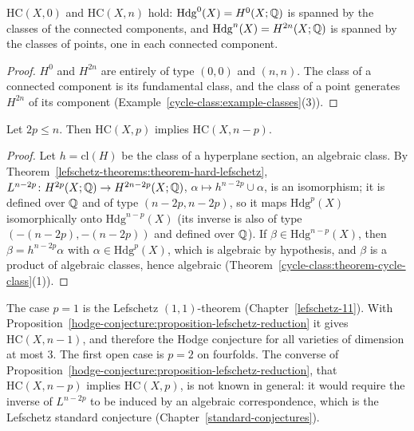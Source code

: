 \begin{proposition}\label{hodge-conjecture:proposition-trivial-degrees}
$\mathrm{HC}(X, 0)$ and $\mathrm{HC}(X, n)$ hold: $\mathrm{Hdg}^0(X) = H^0(X; \mathbb{Q})$ is spanned by the classes of the connected components, and $\mathrm{Hdg}^n(X) = H^{2n}(X; \mathbb{Q})$ is spanned by the classes of
points, one in each connected component.
\end{proposition}

\begin{proof}
$H^0$ and $H^{2n}$ are entirely of type $(0,0)$ and $(n,n)$. The class of a connected component is its fundamental class, and the class of a point generates $H^{2n}$ of its component
(Example~\ref{cycle-class:example-classes}(3)).
\end{proof}

\begin{proposition}\label{hodge-conjecture:proposition-lefschetz-reduction}
Let $2p \leq n$. Then $\mathrm{HC}(X, p)$ implies $\mathrm{HC}(X, n - p)$.
\end{proposition}

\begin{proof}
Let $h = \mathrm{cl}(H)$ be the class of a hyperplane section, an algebraic class. By Theorem~\ref{lefschetz-theorems:theorem-hard-lefschetz}, $L^{n-2p} \colon H^{2p}(X; \mathbb{Q}) \to H^{2n-2p}(X; \mathbb{Q})$,
$\alpha \mapsto h^{n-2p} \cup \alpha$, is an isomorphism; it is defined over $\mathbb{Q}$ and of type $(n-2p, n-2p)$, so it maps $\mathrm{Hdg}^p(X)$ isomorphically onto $\mathrm{Hdg}^{n-p}(X)$ (its inverse is
also of type $(-(n-2p), -(n-2p))$ and defined over $\mathbb{Q}$). If $\beta \in \mathrm{Hdg}^{n-p}(X)$, then $\beta = h^{n-2p}\alpha$ with $\alpha \in \mathrm{Hdg}^p(X)$, which is algebraic by hypothesis, and
$\beta$ is a product of algebraic classes, hence algebraic (Theorem~\ref{cycle-class:theorem-cycle-class}(1)).
\end{proof}

\begin{remark}\label{hodge-conjecture:remark-small-dimension}
The case $p = 1$ is the Lefschetz $(1,1)$-theorem (Chapter~\ref{lefschetz-11}). With Proposition~\ref{hodge-conjecture:proposition-lefschetz-reduction} it gives $\mathrm{HC}(X, n - 1)$, and
therefore the Hodge conjecture for all varieties of dimension at most $3$. The first open case is $p = 2$ on fourfolds. The converse of
Proposition~\ref{hodge-conjecture:proposition-lefschetz-reduction}, that $\mathrm{HC}(X, n-p)$ implies $\mathrm{HC}(X, p)$, is not known in general: it would require the inverse of $L^{n-2p}$ to be
induced by an algebraic correspondence, which is the Lefschetz standard conjecture (Chapter~\ref{standard-conjectures}).
\end{remark}

